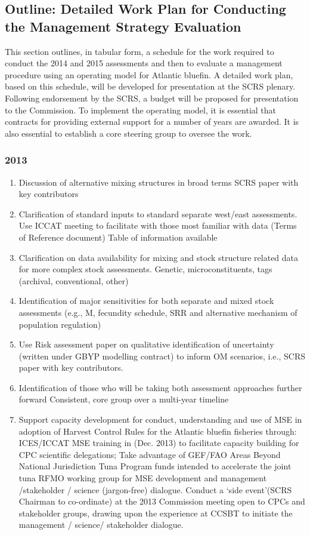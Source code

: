 

\subsection*{Outline: Detailed Work Plan for Conducting the Management Strategy Evaluation}
\label{sub:outline}

This section outlines, in tabular form, a schedule for the work required to conduct the 2014 and 2015 assessments and then 
to evaluate a management procedure using an operating model for Atlantic bluefin. A detailed work plan, based on this schedule, 
will be developed for presentation at the SCRS plenary. Following endorsement by the SCRS, a budget will be proposed for 
presentation to the Commission. To implement the operating model, it is essential that contracts for providing external 
support for a number of years are awarded. It is also essential to establish a core steering group to oversee the work.

\subsubsection*{2013}

\begin{enumerate}
\item Discussion of alternative mixing structures in broad terms SCRS paper with key contributors
\item Clarification of standard inputs to standard separate west/east assessments.
Use ICCAT meeting to facilitate with those most familiar with data (Terms of Reference document)
Table of information available
\item Clarification on data availability for mixing and stock structure related data for more complex stock assessments.
Genetic, microconstituents, tags (archival, conventional, other)
\item Identification of major sensitivities for both separate and mixed stock assessments (e.g., M, fecundity schedule, SRR and alternative mechanism of population regulation)
\item Use Risk assessment paper on qualitative identification of uncertainty (written under GBYP modelling contract) to inform OM scenarios, i.e., SCRS paper with key contributors.
\item Identification of those who will be taking both assessment approaches further forward
Consistent, core group over a multi-year timeline
\item Support capacity development for conduct, understanding and use of MSE in adoption of Harvest Control Rules for the Atlantic bluefin fisheries through:
ICES/ICCAT MSE training in (Dec. 2013) to facilitate capacity building for CPC scientific delegations; 
Take advantage of GEF/FAO Areas Beyond National Jurisdiction Tuna Program funds intended to accelerate the joint tuna RFMO working group for MSE development and management /stakeholder / science (jargon-free) dialogue.
Conduct a ‘side event’(SCRS Chairman to co-ordinate) at the 2013 Commission meeting open to CPCs and stakeholder groups, drawing upon the experience at CCSBT to initiate the management / science/ stakeholder dialogue. 
\end{enumerate}


